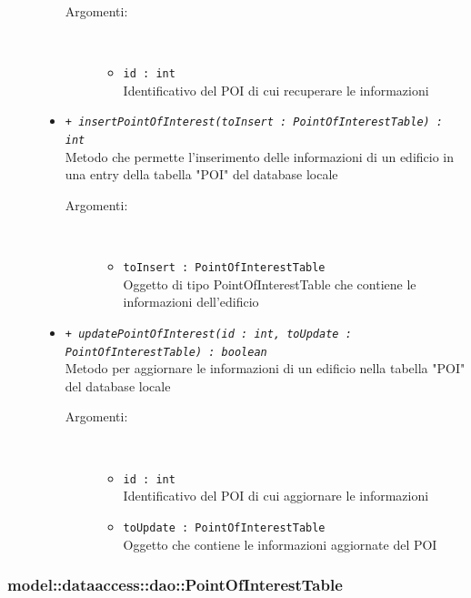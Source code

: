 \documentclass[../DefinizioneDiProdotto.tex]{subfiles}
\begin{document}
\begin{description}
\begin{itemize}
 \begin{description}
\item[Argomenti:] \
\begin{itemize}
\item \texttt{id : int}\\
Identificativo del POI di cui recuperare le informazioni\end{itemize}
\end{description}
\item \texttt{+ \textit{insertPointOfInterest(toInsert : PointOfInterestTable) : int}}\\
Metodo che permette l'inserimento delle informazioni di un edificio in una entry della tabella "POI" del database locale
 \begin{description}
\item[Argomenti:] \
\begin{itemize}
\item \texttt{toInsert : PointOfInterestTable}\\
Oggetto di tipo PointOfInterestTable che contiene le informazioni dell'edificio\end{itemize}
\end{description}
\item \texttt{+ \textit{updatePointOfInterest(id : int, toUpdate : PointOfInterestTable) : boolean}}\\
Metodo per aggiornare le informazioni di un edificio nella tabella "POI" del database locale
 \begin{description}
\item[Argomenti:] \
\begin{itemize}
\item \texttt{id : int}\\
Identificativo del POI di cui aggiornare le informazioni\item \texttt{toUpdate : PointOfInterestTable}\\
Oggetto che contiene le informazioni aggiornate del POI\end{itemize}
\end{description}
\end{itemize}
\end{description}

\subsubsection{model::dataaccess::dao::PointOfInterestTable}
\end{document}

